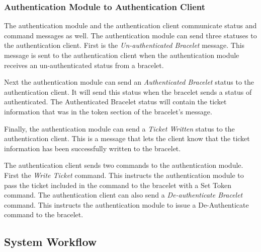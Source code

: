 \subsubsection{Authentication Module to Authentication Client}

The authentication module and the authentication client communicate status and command messages as well.  The authentication module can send three statuses to the authentication client.  First is the \emph{Un-authenticated Bracelet} message.  This message is sent to the authentication client when the authentication module receives an un-authenticated status from a bracelet.

Next the authentication module can send an \emph{Authenticated Bracelet} status to the authentication client.  It will send this status when the bracelet sends a status of authenticated.  The Authenticated Bracelet status will contain the ticket information that was in the token section of the bracelet's message.

Finally, the authentication module can send a \emph{Ticket Written} status to the authentication client.  This is a message that lets the client know that the ticket information has been successfully written to the bracelet.  

The authentication client sends two commands to the authentication module.  First the \emph{Write Ticket} command.  This instructs the authentication module to pass the ticket included in the command to the bracelet with a Set Token command.  The authentication client can also send a \emph{De-authenticate Bracelet} command.  This instructs the authentication module to issue a De-Authenticate command to the bracelet.

\subsection{System Workflow}

